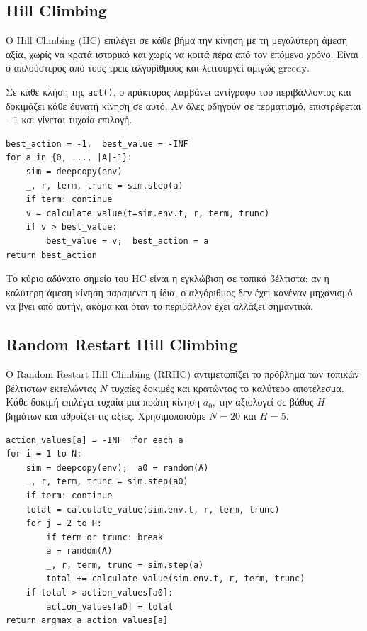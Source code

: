 \documentclass[12pt,a4paper]{article}
\begin{document}
\subsection{\textlatin{Hill Climbing}}

Ο \textlatin{Hill Climbing} (\textlatin{HC}) επιλέγει σε κάθε βήμα την κίνηση με τη
μεγαλύτερη άμεση αξία, χωρίς να κρατά ιστορικό και χωρίς να κοιτά πέρα από τον επόμενο
χρόνο. Είναι ο απλούστερος από τους τρεις αλγορίθμους και λειτουργεί αμιγώς
\textlatin{greedy}.

Σε κάθε κλήση της \texttt{\textlatin{act()}}, ο πράκτορας λαμβάνει αντίγραφο του
περιβάλλοντος και δοκιμάζει κάθε δυνατή κίνηση σε αυτό. Αν όλες οδηγούν σε τερματισμό,
επιστρέφεται $-1$ και γίνεται τυχαία επιλογή.

\begin{lstlisting}[language={}, caption={\textlatin{Hill Climbing -- act(env)}}]
best_action = -1,  best_value = -INF
for a in {0, ..., |A|-1}:
    sim = deepcopy(env)
    _, r, term, trunc = sim.step(a)
    if term: continue
    v = calculate_value(t=sim.env.t, r, term, trunc)
    if v > best_value:
        best_value = v;  best_action = a
return best_action
\end{lstlisting}

Το κύριο αδύνατο σημείο του \textlatin{HC} είναι η εγκλώβιση σε τοπικά βέλτιστα: αν η
καλύτερη άμεση κίνηση παραμένει η ίδια, ο αλγόριθμος δεν έχει κανέναν μηχανισμό να
βγει από αυτήν, ακόμα και όταν το περιβάλλον έχει αλλάξει σημαντικά.

\subsection{\textlatin{Random Restart Hill Climbing}}

Ο \textlatin{Random Restart Hill Climbing} (\textlatin{RRHC}) αντιμετωπίζει το πρόβλημα
των τοπικών βέλτιστων εκτελώντας $N$ τυχαίες δοκιμές και κρατώντας το καλύτερο
αποτέλεσμα. Κάθε δοκιμή επιλέγει τυχαία μια πρώτη κίνηση $a_0$, την αξιολογεί
σε βάθος $H$ βημάτων και αθροίζει τις αξίες. Χρησιμοποιούμε $N=20$ και $H=5$.

\begin{lstlisting}[language={}, caption={\textlatin{Random Restart HC -- act(env)}}]
action_values[a] = -INF  for each a
for i = 1 to N:
    sim = deepcopy(env);  a0 = random(A)
    _, r, term, trunc = sim.step(a0)
    if term: continue
    total = calculate_value(sim.env.t, r, term, trunc)
    for j = 2 to H:
        if term or trunc: break
        a = random(A)
        _, r, term, trunc = sim.step(a)
        total += calculate_value(sim.env.t, r, term, trunc)
    if total > action_values[a0]:
        action_values[a0] = total
return argmax_a action_values[a]
\end{lstlisting}
\end{document}
